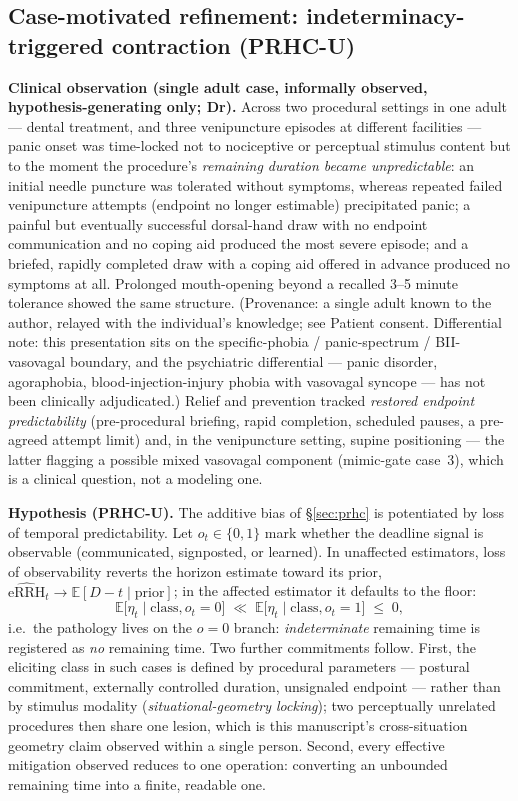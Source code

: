 \documentclass[9pt,twocolumn]{article}
\newcommand{\eRRHhat}{\widehat{\mathrm{eRRH}}}
\begin{document}
\subsection{Case-motivated refinement: indeterminacy-triggered contraction (PRHC-U)}
\label{sec:prhcu}
\textbf{Clinical observation (single adult case, informally observed, hypothesis-generating only; Dr).} Across two procedural settings in one adult --- dental treatment, and three venipuncture episodes at different facilities --- panic onset was time-locked not to nociceptive or perceptual stimulus content but to the moment the procedure's \emph{remaining duration became unpredictable}: an initial needle puncture was tolerated without symptoms, whereas repeated failed venipuncture attempts (endpoint no longer estimable) precipitated panic; a painful but eventually successful dorsal-hand draw with no endpoint communication and no coping aid produced the most severe episode; and a briefed, rapidly completed draw with a coping aid offered in advance produced no symptoms at all. Prolonged mouth-opening beyond a recalled 3--5 minute tolerance showed the same structure. (Provenance: a single adult known to the author, relayed with the individual's knowledge; see Patient consent. Differential note: this presentation sits on the specific-phobia / panic-spectrum / BII-vasovagal boundary, and the psychiatric differential --- panic disorder, agoraphobia, blood-injection-injury phobia with vasovagal syncope --- has not been clinically adjudicated.) Relief and prevention tracked \emph{restored endpoint predictability} (pre-procedural briefing, rapid completion, scheduled pauses, a pre-agreed attempt limit) and, in the venipuncture setting, supine positioning --- the latter flagging a possible mixed vasovagal component (mimic-gate case~3), which is a clinical question, not a modeling one.

\textbf{Hypothesis (PRHC-U).} The additive bias of \S\ref{sec:prhc} is potentiated by loss of temporal predictability. Let $o_t\in\{0,1\}$ mark whether the deadline signal is observable (communicated, signposted, or learned). In unaffected estimators, loss of observability reverts the horizon estimate toward its prior, $\eRRHhat_t\to\mathbb E[D-t\mid \text{prior}]$; in the affected estimator it defaults to the floor:
\begin{equation}
\mathbb E\big[\eta_t \mid \text{class}, o_t=0\big]\;\ll\;\mathbb E\big[\eta_t \mid \text{class}, o_t=1\big]\;\le\;0,
\label{eq:prhcu}
\end{equation}
i.e.\ the pathology lives on the $o=0$ branch: \emph{indeterminate} remaining time is registered as \emph{no} remaining time. Two further commitments follow. First, the eliciting class in such cases is defined by procedural parameters --- postural commitment, externally controlled duration, unsignaled endpoint --- rather than by stimulus modality (\emph{situational-geometry locking}); two perceptually unrelated procedures then share one lesion, which is this manuscript's cross-situation geometry claim observed within a single person. Second, every effective mitigation observed reduces to one operation: converting an unbounded remaining time into a finite, readable one.
\end{document}
